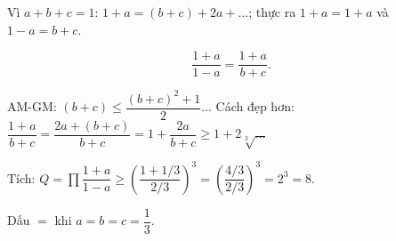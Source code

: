 \begin{loi_giai_cau}
Vì $a+b+c=1$: $1+a=(b+c)+2a+...$; thực ra $1+a=1+a$ và $1-a=b+c$.

\[\frac{1+a}{1-a}=\frac{1+a}{b+c}.\]

AM-GM: $(b+c)\le\dfrac{(b+c)^2+1}{2}$... Cách đẹp hơn: $\dfrac{1+a}{b+c}=\dfrac{2a+(b+c)}{b+c}=1+\dfrac{2a}{b+c}\ge1+2\sqrt[3]{\ldots}$

Tích: $Q=\prod\dfrac{1+a}{1-a}\ge\left(\dfrac{1+1/3}{2/3}\right)^3=\left(\dfrac{4/3}{2/3}\right)^3=2^3=\boxed{8}$.

Dấu $=$ khi $a=b=c=\dfrac{1}{3}$.
\end{loi_giai_cau}
